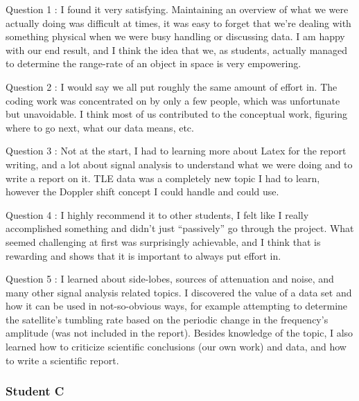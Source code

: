 \documentclass[11pt,a4paper,oneside]{article}
\newcommand{\listskip}{0pt}
\newenvironment{description*}
{\begin{description}
  \setlength{\itemsep}{\listskip}
  \setlength{\parskip}{\listskip}
  \setlength{\parsep}{\listskip}}
{\end{description}}
\newcommand{\quotes}[1]{``#1''}
\begin{document}
\begin{description*}
\item[Question 1]: I found it very satisfying. Maintaining an overview of what we were actually doing was difficult at times, it was easy to forget that we're dealing with something physical when we were busy handling or discussing data. I am happy with our end result, and I think the idea that we, as students, actually managed to determine the range-rate of an object in space is very empowering.
\item[Question 2]: I would say we all put roughly the same amount of effort in. The coding work was concentrated on by only a few people, which was unfortunate but unavoidable. I think most of us contributed to the conceptual work, figuring where to go next, what our data means, etc.
\item[Question 3]: Not at the start, I had to learning more about Latex for the report writing, and a lot about signal analysis to understand what we were doing and to write a report on it. TLE data was a completely new topic I had to learn, however the Doppler shift concept I could handle and could use.
\item[Question 4]: I highly recommend it to other students, I felt like I really accomplished something and didn't just \quotes{passively} go through the project. What seemed challenging at first was surprisingly achievable, and I think that is rewarding and shows that it is important to always put effort in.
\item[Question 5]: I learned about side-lobes, sources of attenuation and noise, and many other signal analysis related topics. I discovered the value of a data set and how it can be used in not-so-obvious ways, for example attempting to determine the satellite's tumbling rate based on the periodic change in the frequency's amplitude (was not included in the report). Besides knowledge of the topic, I also learned how to criticize scientific conclusions (our own work) and data, and how to write a scientific report.
\end{description*}


\subsubsection{Student C}
\end{document}
